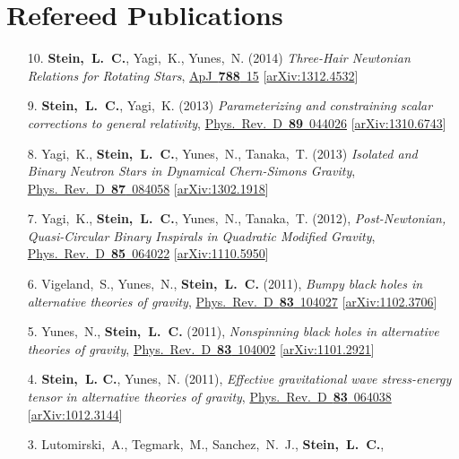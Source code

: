 \section{\sc Refereed Publications}
\begin{enumerate}
\item[{10.}] {\bf Stein,~L.~C.}, Yagi,~K., Yunes,~N. (2014)
  {\it Three-Hair Newtonian Relations for Rotating Stars},
  \href{http://dx.doi.org/10.1088/0004-637X/788/1/15}{ApJ~{\bf 788}~15}
  [\href{http://arxiv.org/abs/1312.4532}{arXiv:1312.4532}]
\item[{9.}] {\bf Stein,~L.~C.}, Yagi,~K. (2013)
  {\it Parameterizing and constraining scalar corrections to general relativity},
  \href{http://dx.doi.org/10.1103/PhysRevD.89.044026}{Phys.~Rev.~D~{\bf 89}~044026}
  [\href{http://arxiv.org/abs/1310.6743}{arXiv:1310.6743}]
\item[{8.}] Yagi,~K., {\bf Stein,~L.~C.}, Yunes,~N., Tanaka,~T. (2013)
  {\it Isolated and Binary Neutron Stars in Dynamical Chern-Simons
    Gravity},
  \href{http://dx.doi.org/10.1103/PhysRevD.87.084058}{Phys.~Rev.~D~{\bf 87}~084058}
  [\href{http://arxiv.org/abs/1302.1918}{arXiv:1302.1918}]
\item[{7.}] Yagi,~K., {\bf Stein,~L.~C.}, Yunes,~N.,
  Tanaka,~T. (2012), {\it Post-Newtonian, Quasi-Circular Binary
    Inspirals in Quadratic Modified Gravity},
  \href{http://dx.doi.org/10.1103/PhysRevD.85.064022}{Phys.~Rev.~D~{\bf 85}~064022}
  [\href{http://arxiv.org/abs/1110.5950}{arXiv:1110.5950}]
\item[{6.}] Vigeland,~S., Yunes,~N., {\bf Stein,~L.~C.} (2011), {\it
    Bumpy black holes in alternative theories of gravity},
  \href{http://dx.doi.org/10.1103/PhysRevD.83.104027}{Phys.~Rev.~D~{\bf 83}~104027}
  [\href{http://arxiv.org/abs/1102.3706}{arXiv:1102.3706}]
\item[{5.}] Yunes,~N., {\bf Stein,~L.~C.} (2011), {\it Nonspinning
    black holes in alternative theories of gravity},
  \href{http://dx.doi.org/10.1103/PhysRevD.83.104002}{Phys.~Rev.~D~{\bf 83}~104002}
  [\href{http://arxiv.org/abs/1101.2921}{arXiv:1101.2921}]
\item[{4.}] {\bf Stein,~L. C.}, Yunes,~N. (2011), {\it Effective
    gravitational wave stress-energy tensor in alternative theories of
    gravity},
  \href{http://dx.doi.org/10.1103/PhysRevD.83.064038}{Phys.~Rev.~D~{\bf 83}~064038}
  [\href{http://arxiv.org/abs/1012.3144}{arXiv:1012.3144}]
\item[{3.}] Lutomirski,~A., Tegmark,~M., Sanchez,~N.~J., {\bf
    Stein,~L.~C.},

\end{enumerate}
